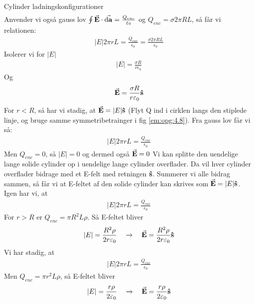 \documentclass[crop=false, class=memoir]{standalone}
\begin{document}
\begin{opgave}{Cylinder ladningskonfigurationer}
\begin{align*}
    \end{align*}
    Anvender vi også gauss lov $\oint\va{E}\cdot\va{\dd{a}}=\frac{Q_{enc}}{\varepsilon_0}$ og $Q_{enc}=\sigma2\pi R L$, så får vi relationen:
    \begin{align*}
        |E|2\pi r L=\frac{Q_{enc}}{\epsilon_0}=\frac{\sigma 2 \pi R L}{\epsilon_0}
    \end{align*}
    Isolerer vi for $|E|$
    \begin{align*}
        |E|=\frac{\sigma R}{r\epsilon_0}
    \end{align*}
    Og
    \begin{align*}
        \va{E}=\frac{\sigma R}{r\varepsilon_0}\vu{s}
    \end{align*}
    \opg
    For $r<R$, så har vi stadig, at $\va{E}=|E|\vu{s}$ (Flyt Q ind i cirklen langs den stiplede linje, og bruge samme symmetribetrainger i fig \ref{em:opg:4.8}). Fra gauss lov får vi så:
    \begin{align*}
        |E|2\pi r L=\frac{Q_{enc}}{\epsilon_0}
    \end{align*}
    Men $Q_{enc}=0$, så $|E|=0$ og dermed også $\va{E}=0$
    \opg
    Vi kan splitte den uendelige lange solide cylinder op i uendelige lange cylinder overflader. Da vil hver cylinder overflader bidrage med et E-felt med retningen $\vu{s}$. Summerer vi alle bidrag sammen, så får vi at E-feltet af den solide cylinder kan skrives som $\va{E}=|E|\vu{s}$.
    \opg
    Igen har vi, at
    \begin{align*}
        |E|2\pi r L=\frac{Q_{enc}}{\epsilon_0}
    \end{align*}
    For $r>R$ er $Q_{enc}=\pi R^2 L \rho$. Så E-feltet bliver
    \begin{align*}
        |E|=\frac{R^2\rho}{2r\varepsilon_0} \quad \xrightarrow{} \quad \va{E}=\frac{R^2\rho}{2r\varepsilon_0}\vu{s}
    \end{align*}
    \opg
    Vi har stadig, at
    \begin{align*}
        |E|2\pi r L=\frac{Q_{enc}}{\epsilon_0}
    \end{align*}
    Men $Q_{enc}=\pi r^2 L\rho$, så E-feltet bliver
    \begin{align*}
        |E|=\frac{r\rho}{2\varepsilon_0} \quad \xrightarrow{} \quad \va{E}=\frac{r\rho}{2\varepsilon_0}\vu{s}
    \end{align*}
\end{opgave}
\end{document}

